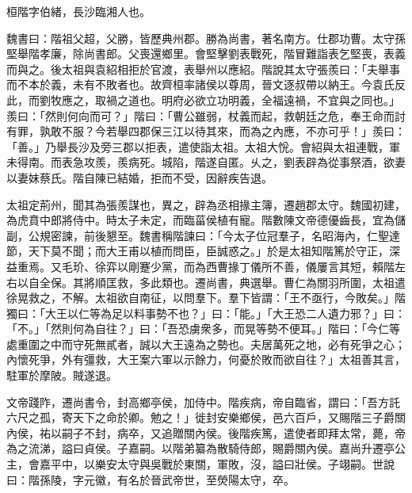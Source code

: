 
\begin{pinyinscope}
桓階字伯緒，長沙臨湘人也。

魏書曰：階祖父超，父勝，皆歷典州郡。勝為尚書，著名南方。仕郡功曹。太守孫堅舉階孝廉，除尚書郎。父喪還鄉里。會堅擊劉表戰死，階冒難詣表乞堅喪，表義而與之。後太祖與袁紹相拒於官渡，表舉州以應紹。階說其太守張羨曰：「夫舉事而不本於義，未有不敗者也。故齊桓率諸侯以尊周，晉文逐叔帶以納王。今袁氏反此，而劉牧應之，取禍之道也。明府必欲立功明義，全福遠禍，不宜與之同也。」羨曰：「然則何向而可？」階曰：「曹公雖弱，杖義而起，救朝廷之危，奉王命而討有罪，孰敢不服？今若舉四郡保三江以待其來，而為之內應，不亦可乎！」羨曰：「善。」乃舉長沙及旁三郡以拒表，遣使詣太祖。太祖大恱。會紹與太祖連戰，軍未得南。而表急攻羨，羨病死。城陷，階遂自匿。乆之，劉表辟為從事祭酒，欲妻以妻妹蔡氏。階自陳已結婚，拒而不受，因辭疾告退。

太祖定荊州，聞其為張羨謀也，異之，辟為丞相掾主簿，遷趙郡太守。魏國初建，為虎賁中郎將侍中。時太子未定，而臨菑侯植有寵。階數陳文帝德優齒長，宜為儲副，公規密諫，前後懇至。魏書稱階諫曰：「今太子位冠羣子，名昭海內，仁聖達節，天下莫不聞；而大王甫以植而問臣，臣誠惑之。」於是太祖知階篤於守正，深益重焉。又毛玠、徐弈以剛蹇少黨，而為西曹掾丁儀所不善，儀屢言其短，賴階左右以自全保。其將順匡救，多此類也。遷尚書，典選舉。曹仁為關羽所圍，太祖遣徐晃救之，不解。太祖欲自南征，以問羣下。羣下皆謂：「王不亟行，今敗矣。」階獨曰：「大王以仁等為足以料事勢不也？」曰：「能。」「大王恐二人遺力邪？」曰：「不。」「然則何為自往？」曰：「吾恐虜衆多，而晃等勢不便耳。」階曰：「今仁等處重圍之中而守死無貳者，誠以大王遠為之勢也。夫居萬死之地，必有死爭之心；內懷死爭，外有彊救，大王案六軍以示餘力，何憂於敗而欲自往？」太祖善其言，駐軍於摩陂。賊遂退。

文帝踐阼，遷尚書令，封高鄉亭侯，加侍中。階疾病，帝自臨省，謂曰：「吾方託六尺之孤，寄天下之命於卿。勉之！」徙封安樂鄉侯，邑六百戶，又賜階三子爵關內侯，祐以嗣子不封，病卒，又追贈關內侯。後階疾篤，遣使者即拜太常，薨，帝為之流涕，謚曰貞侯。子嘉嗣。以階弟纂為散騎侍郎，賜爵關內侯。嘉尚升遷亭公主，會嘉平中，以樂安太守與吳戰於東關，軍敗，沒，謚曰壯侯。子翊嗣。世說曰：階孫陵，字元徽，有名於晉武帝世，至熒陽太守，卒。


\end{pinyinscope}